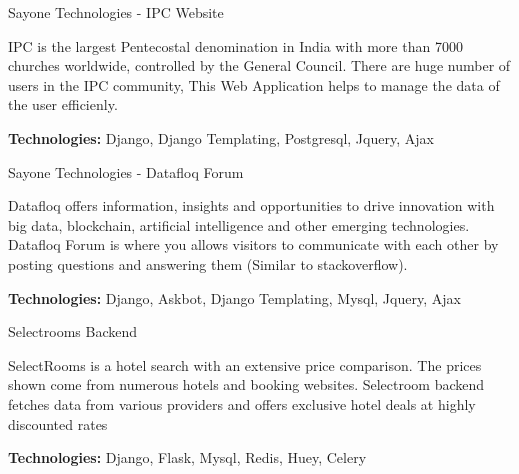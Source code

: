 \break{}


\begin{cventries}

  \cventry
    {} %
    {Sayone Technologies - IPC Website} %
    {} %
    {} %
    {
      \begin{cvitems} %
        {IPC is the largest Pentecostal denomination in India with more than 7000 churches worldwide, controlled by the General Council. There are huge number of users in the IPC community, This Web Application helps to manage the data of  the user efficienly.}
        \item {\textbf{Technologies:} Django, Django Templating, Postgresql, Jquery, Ajax}
      \end{cvitems}
    }

  \cventry
    {} %
    {Sayone Technologies - Datafloq Forum} %
    {} %
    {} %
    {
      \begin{cvitems} %
        {Datafloq offers information, insights and opportunities to drive innovation with big data, blockchain, artificial intelligence and other emerging technologies. Datafloq Forum is where you allows visitors to communicate with each other by posting questions and answering them (Similar to stackoverflow).}
        \item {\textbf{Technologies:} Django, Askbot, Django Templating, Mysql, Jquery, Ajax}
      \end{cvitems}
    }
  
  \cventry
    {} %
    {Selectrooms Backend} %
    {} %
    {} %
    {
      \begin{cvitems} %
        {SelectRooms is a hotel search with an extensive price comparison. The prices shown come from numerous hotels and booking websites. Selectroom backend fetches data from various providers and offers exclusive hotel deals at highly discounted rates}
        \item {\textbf{Technologies:} Django, Flask, Mysql, Redis, Huey, Celery}
      \end{cvitems}
    }
    

\end{cventries}
